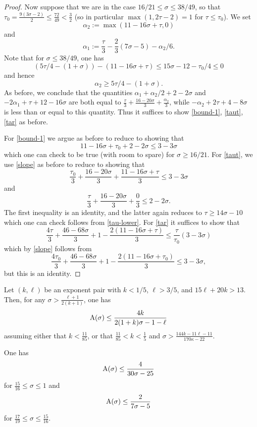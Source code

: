 \begin{proof}
Now suppose that we are in the case $16/21 \leq \sigma \leq 38/49$, so that $\tau_0 = \frac{9(3\sigma-2)}{2} \leq \frac{72}{49} < \frac{3}{2}$ (so in particular $\max(1,2\tau-2) = 1$ for $\tau \leq \tau_0$).  We set
$$ \alpha_2 := \max(11 - 16 \sigma + \tau,0)$$
and
$$ \alpha_1 := \frac{\tau}{3} - \frac{2}{3} (7\sigma-5) - \alpha_2/6.$$
Note that for $\sigma \leq 38/49$, one has
$$ (5\tau/4 - (1+\sigma)) - (11 - 16 \sigma + \tau) \leq 15\sigma - 12 - \tau_0/4 \leq 0$$
and hence
$$ \alpha_2 \geq 5\tau/4 - (1+\sigma).$$
As before, we conclude that the quantities $\alpha_1+\alpha_2/2 + 2-2\sigma$ and $-2\alpha_1 + \tau + 12 - 16 \sigma$ are both equal to $\frac{\tau}{3} + \frac{16-20\sigma}{3} + \frac{\alpha_2}{3}$, while $-\alpha_2 + 2\tau+4-8\sigma$ is less than or equal to this quantity.  Thus it suffices to show \eqref{bound-1}, \eqref{taut}, \eqref{tar} as before.

For \eqref{bound-1} we argue as before to reduce to showing that
$$ 11 - 16 \sigma + \tau_0 + 2 - 2 \sigma \leq 3 - 3\sigma$$
which one can check to be true (with room to spare) for $\sigma \geq 16/21$.  For \eqref{taut}, we use \eqref{slope} as before to reduce to showing that
$$ \frac{\tau_0}{3} + \frac{16-20\sigma}{3} + \frac{11 - 16 \sigma + \tau}{3} \leq 3 -3 \sigma$$
and
$$ \frac{\tau}{3} + \frac{16-20\sigma}{3} + \frac{0}{3} \leq 2 -2 \sigma.$$
The first inequality is an identity, and the latter again reduces to  $\tau \geq 14\sigma-10$ which one can check follows from \eqref{tau-lower}.  For \eqref{tar} it suffices to show that
$$ \frac{4\tau}{3} + \frac{46-68\sigma}{3}  + 1 - \frac{2(11 - 16 \sigma + \tau)}{3} \leq \frac{\tau}{\tau_0} (3-3\sigma)$$
which by \eqref{slope} follows from
$$ \frac{4\tau_0}{3} + \frac{46-68\sigma}{3}  + 1 - \frac{2(11 - 16 \sigma + \tau_0)}{3} \leq 3 - 3\sigma,$$
but this is an identity.
\end{proof}

\begin{theorem}\label{bourgain-zd}\cite[Proposition 3]{bourgain_remarks_1995}  Let $(k,\ell)$ be an exponent pair with $k < 1/5$, $\ell > 3/5$, and $15\ell + 20k > 13$.  Then, for any $\sigma > \frac{\ell+1}{2(k+1)}$, one has
    $$ \mathrm{A}(\sigma) \leq \frac{4k}{2(1+k)\sigma - 1 - \ell}$$
    assuming either that $k < \frac{11}{85}$, or that $\frac{11}{85} < k < \frac{1}{5}$ and $\sigma > \frac{144k-11\ell-11}{170\kappa-22}$.
\end{theorem}

\begin{corollary}\label{bourgain-zero-density}\cite[Corollary 4]{bourgain_remarks_1995}  One has
    $$ \mathrm{A}(\sigma) \leq \frac{4}{30\sigma-25}$$
    for $\frac{15}{16} \leq \sigma \leq 1$
    and
    $$ \mathrm{A}(\sigma) \leq \frac{2}{7\sigma-5}$$
    for $\frac{17}{19} \leq \sigma \leq \frac{15}{16}$.
\end{corollary}

